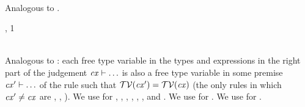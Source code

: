 \begin{bycase}
\Case{\Revar}
\begin{derivation}
\step{\vdecO\in\cx}{\premof{\Revar}}
\step{\cxwf{\cx}}{\premof{\Revar}}
\end{derivation}

\Case{\Reop}\\
Analogous to \Rtedef.

\Case{\Reabs}
\begin{derivation}
     {\indhyp, 1}
\steP{\cxtvar{\snoc{\cx}{\vdecO}}=\cxtvarO}
\end{derivation}

\Case{\Rthax}
\begin{derivation}
     {}
\step{\axO\in\cx}{\premof{\Rthax}}
\step{\cxwfO}{\premof{\Rthax}}
\end{derivation}

\Case{\Rthbool}
      {}

\Case{\restrules}\\
Analogous to \Rtinst: each free type variable in the types and expressions in
the right part of the judgement $\mathit{cx}\vdash\ldots$ is also a free type variable
in some premise $\mathit{cx}'\vdash\ldots$ of the rule such that
$\mathcal{TV}(\mathit{cx}')=\mathcal{TV}(\mathit{cx})$ (the only rules in which $\mathit{cx}'\neq\mathit{cx}$ are
\Reif, \Rthifsbs, \Rthif). We use  for
\Rstrefl, \Rstarr, \Rstrec,
\Redesc, \Rthext, \Rthrec,
and \Rthprojsub.
We use  for \Reabsalpha. We use
 for \Rthabs.

\end{bycase}



